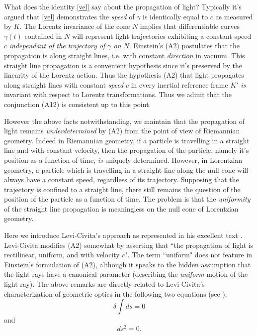 \documentclass[12pt]{article}
\begin{document}
What does the identity \eqref{vel} say about the propagation of light? Typically it's argued that \eqref{vel} demonstrates the \emph{speed} of $\gamma$ is identically equal to $c$ as measured by $K$. The Lorentz invariance of the cone $N$ implies that differentiable curves $\gamma(t)$ contained in $N$ will represent light trajectories exhibiting a constant speed $c$ \emph{independant of the trajectory of $\gamma$ on $N$}. Einstein's (A2) postulates that the propagation is along straight lines, i.e. with constant \emph{direction} in vacuum. This straight line propagation is a convenient hypothesis since it's preserved by the linearity of the Lorentz action. Thus the hypothesis (A2) that light propagates along straight lines with constant \emph{speed} $c$ in every inertial reference frame $K'$ \emph{is} invariant with respect to Lorentz transformations. Thus we admit that the conjunction (A12) is consistent up to this point. 

However the above facts notwithstanding, we maintain that the propagation of light remains \emph{underdetermined} by (A2) from the point of view of Riemannian geometry. Indeed in Riemannian geometry, if a particle is travelling in a straight line and with constant velocity, then the propagation of the particle, namely it's position as a function of time, \emph{is} uniquely determined. However, in Lorentzian geometry, a particle which is travelling in a straight line along the null cone will always have a constant speed, regardless of its trajectory. Supposing that the trajectory is confined to a straight line, there still remains the question of the position of the particle as a function of time. The problem is that the \emph{uniformity} of the straight line propagation is meaningless on the null cone of Lorentzian geometry. 

Here we introduce Levi-Civita's approach as represented in his excellent text \cite{levi}. Levi-Civita modifies (A2) somewhat by asserting that ``the propagation of light is rectilinear, uniform, and with velocity $c$". The term ``uniform" does not feature in Einstein's formulation of (A2), although it speaks to the hidden assumption that the light rays have a canonical parameter (describing the \emph{uniform} motion of the light ray). The above remarks are directly related to Levi-Civita's characterization of geometric optics in the following two equations (see \cite[III.XI.16]{levi}): \begin{equation}
\delta \int ds=0
\label{var}\end{equation}
and
\begin{equation}
ds^2=0.
\end{equation}
\end{document}
